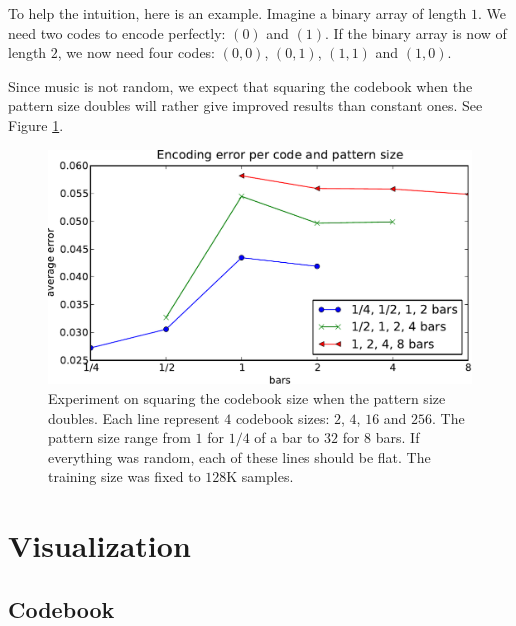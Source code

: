 \documentclass{article}
\begin{document}
To help the intuition, here is an example. Imagine a binary array of 
length $1$. We need two
codes to encode perfectly: $(0)$ and $(1)$. If the binary array is now of
length $2$, we now need four codes: $(0,0)$, $(0,1)$, $(1,1)$ and $(1,0)$.

Since music is not random, we expect that squaring the codebook when the
pattern size doubles will rather give improved results than constant ones.
See Figure \ref{fig:size_pattern}.

\begin{figure}[htb]
\begin{center}
\includegraphics[width=.99\columnwidth]{codesize_patternsize}
\end{center}
\caption{\small{
Experiment on squaring the codebook size when the pattern size doubles.
Each line represent $4$ codebook sizes: $2$, $4$, $16$ and $256$.
The pattern size range from $1$ for $1/4$ of a bar to $32$ for $8$ bars.
If everything was random, each of these lines should be flat. The training
size was fixed to $128$K samples.
}}
\label{fig:size_pattern}
\end{figure}

\section{Visualization} \label{sec:visu}


\subsection{Codebook}\label{sec:codebook}
\end{document}

